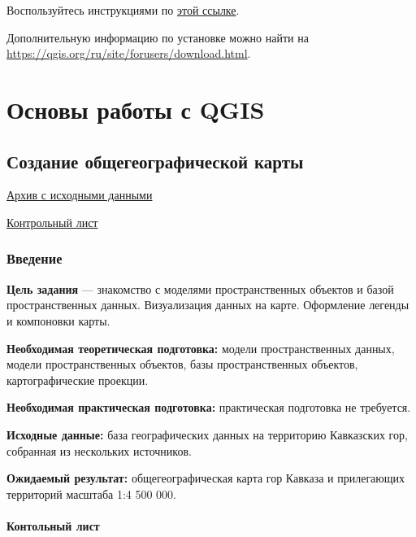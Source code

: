 \documentclass[
  12pt,
]{book}
\begin{document}
Воспользуйтесь инструкциями по \href{https://qgis.org/ru/site/forusers/alldownloads.html\#linux}{этой ссылке}.

Дополнительную информацию по установке можно найти на \url{https://qgis.org/ru/site/forusers/download.html}.

\hypertarget{part-ux43eux441ux43dux43eux432ux44b-ux440ux430ux431ux43eux442ux44b-ux441-qgis}{%
\part{Основы работы с QGIS}\label{part-ux43eux441ux43dux43eux432ux44b-ux440ux430ux431ux43eux442ux44b-ux441-qgis}}

\hypertarget{map-design-general}{%
\chapter{Создание общегеографической карты}\label{map-design-general}}

\href{https://github.com/aentin/qgis-course/raw/master/files/Ex01.zip}{Архив с исходными данными}

\href{https://github.com/aentin/qgis-course/raw/master/files/Ex01_\%D0\%BE\%D1\%82\%D1\%87\%D1\%91\%D1\%82.docx}{Контрольный лист}

\hypertarget{map-design-general-intro}{%
\section{Введение}\label{map-design-general-intro}}

\textbf{Цель задания} --- знакомство с моделями пространственных объектов и базой пространственных данных. Визуализация данных на карте. Оформление легенды и компоновки карты.

\textbf{Необходимая теоретическая подготовка:} модели пространственных данных, модели пространственных объектов, базы пространственных объектов, картографические проекции.

\textbf{Необходимая практическая подготовка:} практическая подготовка не требуется.

\textbf{Исходные данные:} база географических данных на территорию Кавказских гор, собранная из нескольких источников.

\textbf{Ожидаемый результат:} общегеографическая карта гор Кавказа и прилегающих территорий масштаба 1:4 500 000.

\hypertarget{map-design-general-checklist}{%
\subsection{Контольный лист}\label{map-design-general-checklist}}
\end{document}
